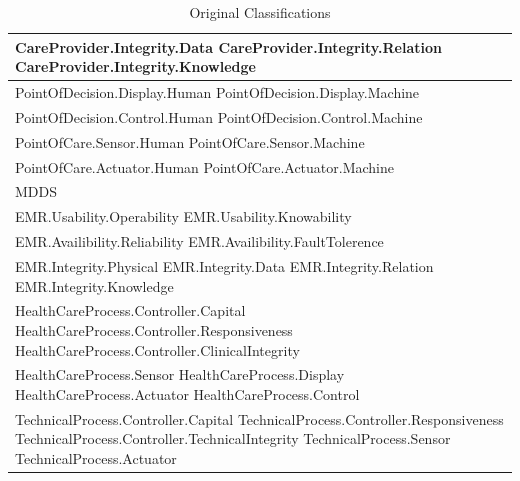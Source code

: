 \documentclass[11pt, notitlepage,abstracton,oneside]{article}   	%
\begin{document}
\begin{table}[htdp]
\caption{Original Classifications}
\label{tab:OriginalClassifications}
\begin{center}
\begin{tabular}{|p{80mm}|}
\hline
CareProvider.Integrity.Data \newline CareProvider.Integrity.Relation \newline CareProvider.Integrity.Knowledge \\ \hline
PointOfDecision.Display.Human \newline PointOfDecision.Display.Machine \\ \hline
PointOfDecision.Control.Human \newline PointOfDecision.Control.Machine \\ \hline
PointOfCare.Sensor.Human \newline PointOfCare.Sensor.Machine \\ \hline
PointOfCare.Actuator.Human \newline PointOfCare.Actuator.Machine \\ \hline
MDDS \\ \hline
EMR.Usability.Operability \newline EMR.Usability.Knowability \\ \hline
EMR.Availibility.Reliability \newline EMR.Availibility.FaultTolerence \\ \hline
EMR.Integrity.Physical \newline EMR.Integrity.Data \newline EMR.Integrity.Relation \newline EMR.Integrity.Knowledge \\ \hline
HealthCareProcess.Controller.Capital \newline HealthCareProcess.Controller.Responsiveness \newline HealthCareProcess.Controller.ClinicalIntegrity \\ \hline
HealthCareProcess.Sensor \newline HealthCareProcess.Display \newline HealthCareProcess.Actuator \newline HealthCareProcess.Control \\ \hline
TechnicalProcess.Controller.Capital \newline TechnicalProcess.Controller.Responsiveness \newline TechnicalProcess.Controller.TechnicalIntegrity \newline TechnicalProcess.Sensor \newline TechnicalProcess.Actuator \\ \hline
\end{tabular}
\end{center}
\label{default}
\end{table}%
\end{document}
